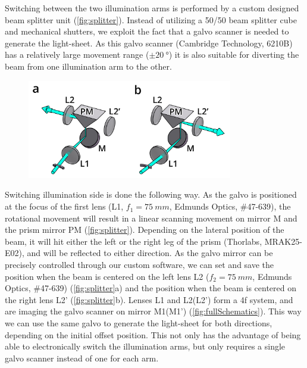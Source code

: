     \label{sec:splitter}

    Switching between the two illumination arms is performed by a custom designed beam splitter unit (\autoref{fig:splitter}). Instead of utilizing a 50/50 beam splitter cube and mechanical shutters, we exploit the fact that a galvo scanner is needed to generate the light-sheet. As this galvo scanner (Cambridge Technology, 6210B) has a relatively large movement range ($\pm \SI{20}{\degree}$) it is also suitable for diverting the beam from one illumination arm to the other.

    \begin{figure}[htb]
      \centering
      \includegraphics[width=0.8\textwidth]{SW/splitterFigure}
      \label{fig:splitter}
    \end{figure}

    Switching illumination side is done the following way. As the galvo is positioned at the focus of the first lens (L1, $f_1 = \SI{75}{mm}$, Edmunds Optics, \#47-639), the rotational movement will result in a linear scanning movement on mirror M and the prism mirror PM (\autoref{fig:splitter}). Depending on the lateral position of the beam, it will hit either the left or the right leg of the prism (Thorlabs, MRAK25-E02), and will be reflected to either direction. As the galvo mirror can be precisely controlled through our custom software, we can set and save the position when the beam is centered on the left lens L2 ($f_2 = \SI{75}{mm}$, Edmunds Optics, \#47-639) (\autoref{fig:splitter}a) and the position when the beam is centered on the right lens L2' (\autoref{fig:splitter}b). Lenses L1 and L2(L2') form a 4f system, and are imaging the galvo scanner on mirror M1(M1') (\autoref{fig:fullSchematics}). This way we can use the same galvo to generate the light-sheet for both directions, depending on the initial offset position. This not only has the advantage of being able to electronically switch the illumination arms, but only requires a single galvo scanner instead of one for each arm.
    
